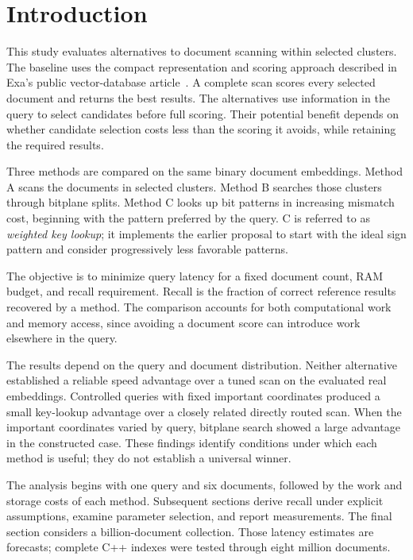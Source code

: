 \section{Introduction}
This study evaluates alternatives to document scanning within selected clusters. The baseline
uses the compact representation and scoring approach described in Exa's public vector-database
article~\cite{exa}. A complete scan scores every selected document and returns the best results.
The alternatives use information in the query to select candidates before full scoring. Their
potential benefit depends on whether candidate selection costs less than the scoring it avoids,
while retaining the required results.

Three methods are compared on the same binary document embeddings. Method A scans the documents
in selected clusters. Method B searches those clusters through bitplane splits. Method C looks
up bit patterns in increasing mismatch cost, beginning with the pattern preferred by the query.
C is referred to as \emph{weighted key lookup}; it implements the earlier proposal to start
with the ideal sign pattern and consider progressively less favorable patterns.

The objective is to minimize query latency for a fixed document count, RAM budget, and recall
requirement. Recall is the fraction of correct reference results recovered by a method. The
comparison accounts for both computational work and memory access, since avoiding a document
score can introduce work elsewhere in the query.

The results depend on the query and document distribution. Neither alternative established a
reliable speed advantage over a tuned scan on the evaluated real embeddings. Controlled queries
with fixed important coordinates produced a small key-lookup advantage over a closely related
directly routed scan. When the important coordinates varied by query, bitplane search showed
a large advantage in the constructed case. These findings identify conditions under which
each method is useful; they do not establish a universal winner.

The analysis begins with one query and six documents, followed by the work and storage costs
of each method. Subsequent sections derive recall under explicit assumptions, examine parameter
selection, and report measurements. The final section considers a billion-document collection.
Those latency estimates are forecasts; complete C++ indexes were tested through eight million
documents.


